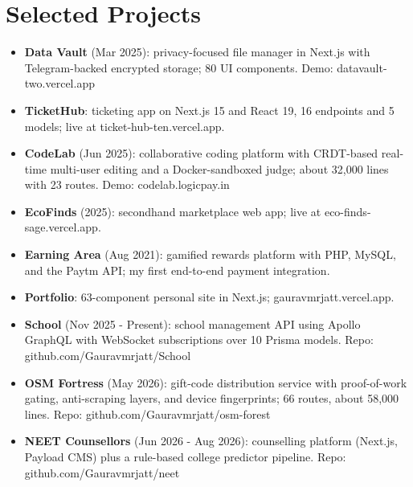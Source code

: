\documentclass[11pt,a4paper,sans]{moderncv}
\begin{document}

\section{Selected Projects}
\vspace{1pt}
\begin{itemize}
    \item {\textbf{Data Vault} (Mar 2025): privacy-focused file manager in Next.js with Telegram-backed encrypted storage; 80 UI components. Demo: datavault-two.vercel.app}
    \item {\textbf{TicketHub}: ticketing app on Next.js 15 and React 19, 16 endpoints and 5 models; live at ticket-hub-ten.vercel.app.}
    \item {\textbf{CodeLab} (Jun 2025): collaborative coding platform with CRDT-based real-time multi-user editing and a Docker-sandboxed judge; about 32,000 lines with 23 routes. Demo: codelab.logicpay.in}
    \item {\textbf{EcoFinds} (2025): secondhand marketplace web app; live at eco-finds-sage.vercel.app.}
    \item {\textbf{Earning Area} (Aug 2021): gamified rewards platform with PHP, MySQL, and the Paytm API; my first end-to-end payment integration.}
    \item {\textbf{Portfolio}: 63-component personal site in Next.js; gauravmrjatt.vercel.app.}
    \item {\textbf{School} (Nov 2025 - Present): school management API using Apollo GraphQL with WebSocket subscriptions over 10 Prisma models. Repo: github.com/Gauravmrjatt/School}
    \item {\textbf{OSM Fortress} (May 2026): gift-code distribution service with proof-of-work gating, anti-scraping layers, and device fingerprints; 66 routes, about 58,000 lines. Repo: github.com/Gauravmrjatt/osm-forest}
    \item {\textbf{NEET Counsellors} (Jun 2026 - Aug 2026): counselling platform (Next.js, Payload CMS) plus a rule-based college predictor pipeline. Repo: github.com/Gauravmrjatt/neet}
\end{itemize}

\end{document}
